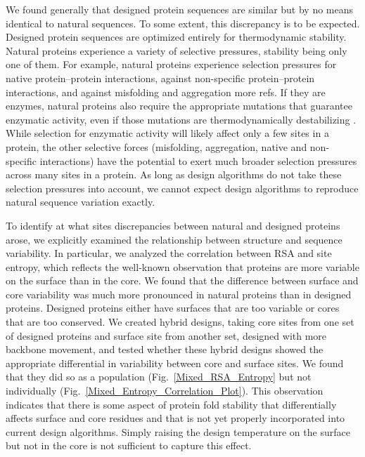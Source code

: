 \documentclass[12pt]{article}
\begin{document}
We found generally that designed protein sequences are similar but by no means identical to natural sequences. To some extent, this discrepancy is to be expected. Designed protein sequences are optimized entirely for thermodynamic stability. Natural proteins experience a variety of selective pressures, stability being only one of them. For example, natural proteins experience selection pressures for native protein--protein interactions, against non-specific protein--protein interactions, and against misfolding and aggregation \citep{Drummond2008}{\color{red}more refs}. If they are enzymes, natural proteins also require the appropriate mutations that guarantee enzymatic activity, even if those mutations are thermodynamically destabilizing \citep{Bloometal2006}. While selection for enzymatic activity will likely affect only a few sites in a protein, the other selective forces (misfolding, aggregation, native and non-specific interactions) have the potential to exert much broader selection pressures across many sites in a protein. As long as design algorithms do not take these selection pressures into account, we cannot expect design algorithms to reproduce natural sequence variation exactly.

To identify at what sites discrepancies between natural and designed proteins arose, we explicitly examined the relationship between structure and sequence variability. In particular, we analyzed the correlation between RSA and site entropy, which reflects the well-known observation that proteins are more variable on the surface than in the core. We found that the difference between surface and core variability was much more pronounced in natural proteins than in designed proteins. Designed proteins either have surfaces that are too variable or cores that are too conserved. We created hybrid designs, taking core sites from one set of designed proteins and surface site from another set, designed with more backbone movement, and tested whether these hybrid designs showed the appropriate differential in variability between core and surface sites. We found that they did so as a population (Fig.~\ref{Mixed_RSA_Entropy} but not individually (Fig.~\ref{Mixed_Entropy_Correlation_Plot}). This observation indicates that there is some aspect of protein fold stability that differentially affects surface and core residues and that is not yet properly incorporated into current design algorithms. Simply raising the design temperature on the surface but not in the core is not sufficient to capture this effect.
\end{document}
